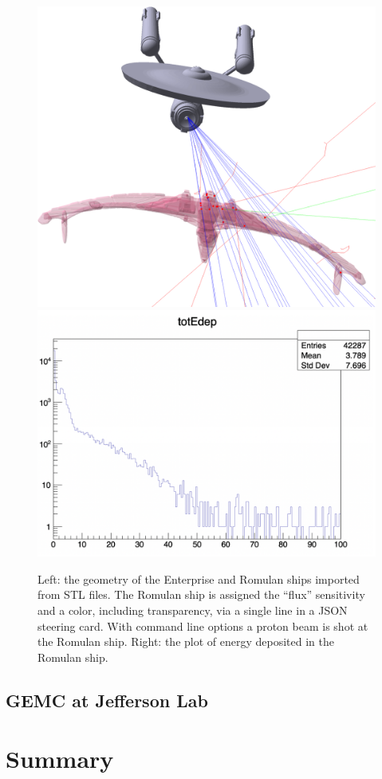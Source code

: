 \begin{figure}[h]
    \centering
    \includegraphics[width=.5\textwidth]{img/startrek}
    \includegraphics[width=.48\textwidth]{img/startrek_edep}
    \caption{Left: the geometry of the Enterprise and Romulan ships imported from STL files.
    The Romulan ship is assigned the ``flux'' sensitivity and a color, including transparency, via a single line in a JSON steering card.
    With command line options a proton beam is shot at the Romulan ship.
    Right: the plot of energy deposited in the Romulan ship.}
    \label{fig:cad_import}
\end{figure}


\subsection{GEMC at Jefferson Lab}
\label{subsec:clas12}


\section{Summary}
\label{sec:summary}

